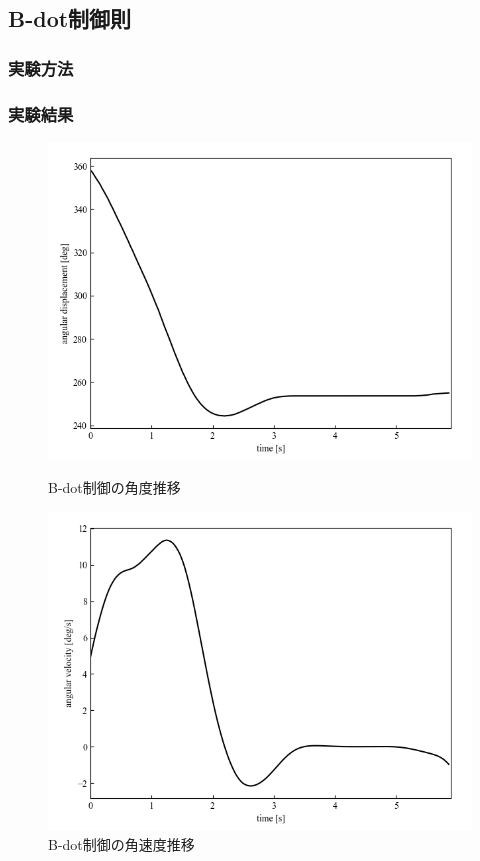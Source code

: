 \subsection{B-dot制御則}
\subsubsection{実験方法}
\subsubsection{実験結果}

\begin{figure}[h]
	\centering
	\begin{minipage}{0.43\columnwidth}
	  \centering
	  \includegraphics[width=\columnwidth]{./figure/kb5deg.png}
	  \caption{B-dot制御の角度推移}
	  \label{fig:kb5deg}
	\end{minipage}
	\hspace{5mm}
	\begin{minipage}{0.43\columnwidth}
	  \centering
	  \includegraphics[width=\columnwidth]{./figure/kb5degpers.png}
	  \caption{B-dot制御の角速度推移}
	  \label{fig:kb5degpers}
	\end{minipage}
\end{figure}

